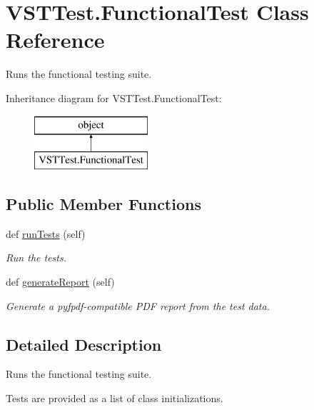 \hypertarget{class_v_s_t_test_1_1_functional_test}{}\section{V\+S\+T\+Test.\+Functional\+Test Class Reference}
\label{class_v_s_t_test_1_1_functional_test}


Runs the functional testing suite.  


Inheritance diagram for V\+S\+T\+Test.\+Functional\+Test\+:\begin{figure}[H]
\begin{center}
\leavevmode
\includegraphics[height=2.000000cm]{class_v_s_t_test_1_1_functional_test}
\end{center}
\end{figure}
\subsection*{Public Member Functions}
\begin{DoxyCompactItemize}
\item 
def \hyperlink{class_v_s_t_test_1_1_functional_test_a8550a74691ecc31c808a274a8a16a76a}{run\+Tests} (self)
\begin{DoxyCompactList}\small\item\em Run the tests. \end{DoxyCompactList}\item 
def \hyperlink{class_v_s_t_test_1_1_functional_test_ac941fa6d87621ff6709715ea0b50dd49}{generate\+Report} (self)
\begin{DoxyCompactList}\small\item\em Generate a pyfpdf-\/compatible P\+DF report from the test data. \end{DoxyCompactList}\end{DoxyCompactItemize}


\subsection{Detailed Description}
Runs the functional testing suite. 

Tests are provided as a list of class initializations. 

